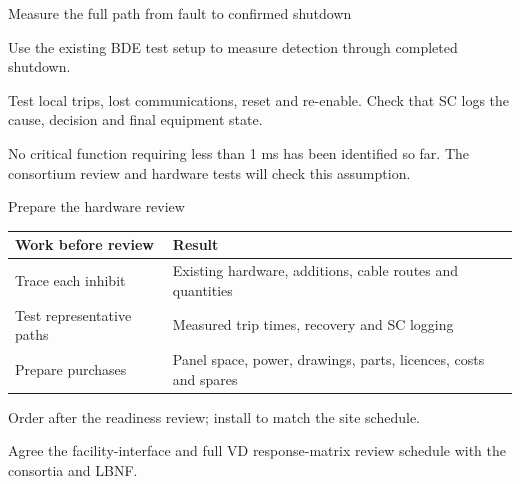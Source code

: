 \documentclass[aspectratio=169,11pt]{beamer}
\begin{document}
\begin{frame}{Measure the full path from fault to confirmed shutdown}
\centering
{}\par\smallskip
\raggedright{}\par\smallskip
\raggedright

Use the existing BDE test setup to measure detection through completed shutdown.\par\medskip
Test local trips, lost communications, reset and re-enable. Check that SC logs the cause, decision and final equipment state.\par\bigskip
No critical function requiring less than 1 ms has been identified so far. The consortium review and hardware tests will check this assumption.
\end{frame}

\DpsMilestones

\begin{frame}{Prepare the hardware review}
\renewcommand{\arraystretch}{1.45}
\begin{tabularx}{\textwidth}{@{}>{\RaggedRight\arraybackslash}p{3.4cm}>{\RaggedRight\arraybackslash}X@{}}
\toprule
\textbf{Work before review} & \textbf{Result}\\\midrule
Trace each inhibit & Existing hardware, additions, cable routes and quantities\\
Test representative paths & Measured trip times, recovery and SC logging\\
Prepare purchases & Panel space, power, drawings, parts, licences, costs and spares\\
\bottomrule
\end{tabularx}\par\bigskip
Order after the readiness review; install to match the site schedule.\par\medskip
Agree the facility-interface and full VD response-matrix review schedule with the consortia and LBNF.
\end{frame}
\end{document}
